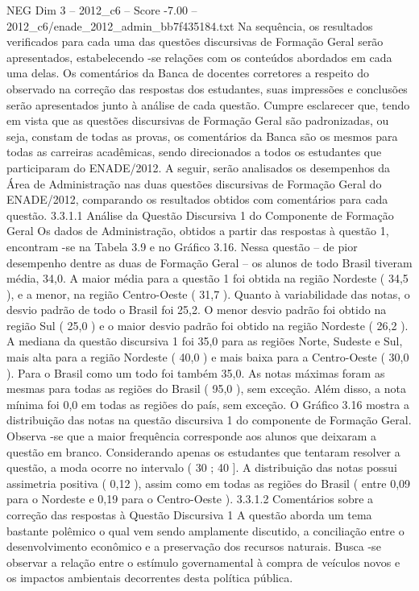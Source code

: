 \begin{textsample}{NEG Dim 3 – 2012\_c6 – Score -7.00 – 2012\_c6/enade\_2012\_admin\_bb7f435184.txt}
Na sequência, os resultados verificados para cada uma das questões discursivas de Formação Geral serão apresentados, estabelecendo -se relações com os conteúdos abordados em cada uma delas.
Os comentários da Banca de docentes corretores a respeito do observado na correção das respostas dos estudantes, suas impressões e conclusões serão apresentados junto à análise de cada questão.
Cumpre esclarecer que, tendo em vista que as questões discursivas de Formação Geral são padronizadas, ou seja, constam de todas as provas, os comentários da Banca são os mesmos para todas as carreiras acadêmicas, sendo direcionados a todos os estudantes que participaram do ENADE/2012.
A seguir, serão analisados os desempenhos da Área de Administração nas duas questões discursivas de Formação Geral do ENADE/2012, comparando os resultados obtidos com comentários para cada questão. 3.3.1.1 Análise da Questão Discursiva 1 do Componente de Formação Geral Os dados de Administração, obtidos a partir das respostas à questão 1, encontram -se na Tabela 3.9 e no Gráfico 3.16.
Nessa questão – de pior desempenho dentre as duas de Formação Geral – os alunos de todo Brasil tiveram média, 34,0.
A maior média para a questão 1 foi obtida na região Nordeste ( 34,5 ), e a menor, na região Centro-Oeste ( 31,7 ).
Quanto à variabilidade das notas, o desvio padrão de todo o Brasil foi 25,2.
O menor desvio padrão foi obtido na região Sul ( 25,0 ) e o maior desvio padrão foi obtido na região Nordeste ( 26,2 ).
A mediana da questão discursiva 1 foi 35,0 para as regiões Norte, Sudeste e Sul, mais alta para a região Nordeste ( 40,0 ) e mais baixa para a Centro-Oeste ( 30,0 ).
Para o Brasil como um todo foi também 35,0.
As notas máximas foram as mesmas para todas as regiões do Brasil ( 95,0 ), sem exceção.
Além disso, a nota mínima foi 0,0 em todas as regiões do país, sem exceção.
O Gráfico 3.16 mostra a distribuição das notas na questão discursiva 1 do componente de Formação Geral.
Observa -se que a maior frequência corresponde aos alunos que deixaram a questão em branco.
Considerando apenas os estudantes que tentaram resolver a questão, a moda ocorre no intervalo ( 30 ; 40 ].
A distribuição das notas possui assimetria positiva ( 0,12 ), assim como em todas as regiões do Brasil ( entre 0,09 para o Nordeste e 0,19 para o Centro-Oeste ). 3.3.1.2 Comentários sobre a correção das respostas à Questão Discursiva 1 A questão aborda um tema bastante polêmico o qual vem sendo amplamente discutido, a conciliação entre o desenvolvimento econômico e a preservação dos recursos naturais.
Busca -se observar a relação entre o estímulo governamental à compra de veículos novos e os impactos ambientais decorrentes desta política pública.

\end{textsample}
